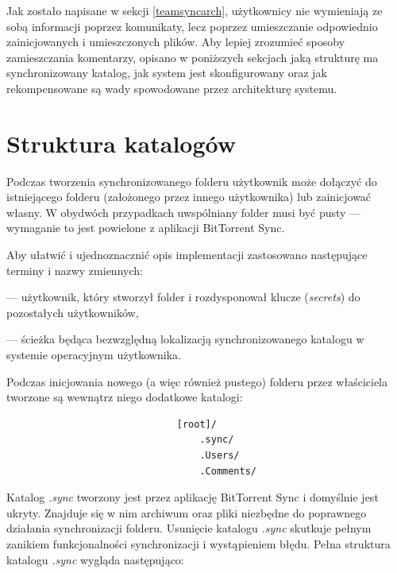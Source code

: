 \documentclass[polish,a4paper,twoside]{ppfcmthesis}
\begin{document}
Jak zostało napisane w sekcji \ref{teamsyncarch}, użytkownicy nie wymieniają ze sobą informacji poprzez komunikaty, lecz poprzez umieszczanie odpowiednio zainicjowanych i umieszczonych plików. Aby lepiej zrozumieć sposoby zamieszczania komentarzy, opisano w poniższych sekcjach jaką strukturę ma synchronizowany katalog, jak system jest skonfigurowany oraz jak rekompensowane są wady spowodowane przez architekturę systemu.

\section{Struktura katalogów}

\label{directorystructure}

Podczas tworzenia synchronizowanego folderu użytkownik może dołączyć do istniejącego folderu (założonego przez innego użytkownika) lub zainicjować własny. W obydwóch przypadkach uwspólniany folder musi być pusty --- wymaganie to jest powielone z aplikacji BitTorrent Sync.

Aby ułatwić i ujednoznacznić opis implementacji zastosowano następujące terminy i nazwy zmiennych:

\begin{description}[noitemsep]
 \item[właściciel] --- użytkownik, który stworzył folder i rozdysponował klucze (\emph{secrets}) do pozostałych użytkowników,
 
 \item[\textbf{[root]}] --- ścieżka będąca bezwzględną lokalizacją synchronizowanego katalogu w systemie operacyjnym użytkownika.
\end{description}

Podczas inicjowania nowego (a więc również pustego) folderu przez właściciela tworzone są wewnątrz niego dodatkowe katalogi:


\begin{verbatim}
                              [root]/
                                  .sync/
                                  .Users/
                                  .Comments/
\end{verbatim}

Katalog \emph{.sync} tworzony jest przez aplikację BitTorrent Sync i domyślnie jest ukryty. Znajduje się w nim archiwum oraz pliki niezbędne do poprawnego działania synchronizacji folderu. Usunięcie katalogu \emph{.sync} skutkuje pełnym zanikiem funkcjonalności synchronizacji i wystąpieniem błędu. Pełna struktura katalogu \emph{.sync} wygląda następująco:
\end{document}
